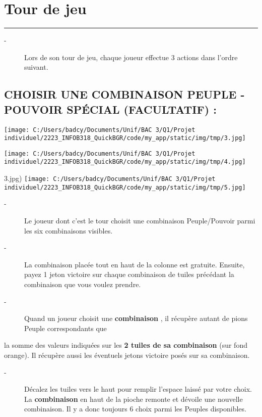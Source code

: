 \documentclass{scrartcl}%
\begin{document}
%
\sectionfont{\color{mygreen}}%
\subsectionfont{\color{mygreen}}%
\subsubsectionfont{\color{mygreen}}%
\section{ Tour de jeu
}%
\label{sec:Tourdejeu}%
\textcolor{mygreen}{\rule{18cm}{0.07cm}}\break%
\begin{description}%
\item[{-} ]%
%
 Lors de son tour de jeu, chaque joueur effectue 3 actions dans l'ordre suivant.
%
\end{description}

%
\subsection{ CHOISIR UNE COMBINAISON PEUPLE {-} POUVOIR SPÉCIAL (FACULTATIF) :
}%
\label{subsec:CHOISIRUNECOMBINAISONPEUPLE{-}POUVOIRSPCIAL(FACULTATIF)}%
%
\begin{center}\texttt{[image: C:/Users/badcy/Documents/Unif/BAC 3/Q1/Projet individuel/2223\_INFOB318\_QuickBGR/code/my\_app/static/img/tmp/3.jpg]}\end{center}%
\texttt{[image: C:/Users/badcy/Documents/Unif/BAC 3/Q1/Projet individuel/2223\_INFOB318\_QuickBGR/code/my\_app/static/img/tmp/4.jpg]}%

%
3.jpg) %
\texttt{[image: C:/Users/badcy/Documents/Unif/BAC 3/Q1/Projet individuel/2223\_INFOB318\_QuickBGR/code/my\_app/static/img/tmp/5.jpg]}%

%

%
\begin{description}%
\item[{-} ]%
%
 Le joueur dont c'est le tour choisit une combinaison Peuple/Pouvoir parmi les six combinaisons visibles.
%
\item[{-} ]%
%
 La combinaison placée tout en haut de la colonne est gratuite. Ensuite, payez 1 jeton victoire sur chaque combinaison de tuiles précédant la combinaison que vous voulez prendre.
%
\item[{-} ]%
%
 Quand un joueur choisit une %
\textcolor{mygreen}{%
\textbf{combinaison}%
}%
, il récupère autant de pions Peuple correspondants que
%
\end{description}%
la somme des valeurs indiquées sur les %
\textcolor{mygreen}{%
\textbf{2 tuiles de sa combinaison}%
}%
\textit{ }%
 (sur fond orange). Il récupère aussi les éventuels jetons victoire posés sur sa combinaison.
%
\begin{description}%
\item[{-} ]%
%
 Décalez les tuiles vers le haut pour remplir l’espace laissé par votre choix. La %
\textcolor{mygreen}{%
\textbf{combinaison}%
}%
\textit{ }%
 en haut de la pioche remonte et dévoile une nouvelle combinaison. Il y a donc toujours 6 choix parmi les Peuples disponibles.
%
\end{description}
\end{document}
